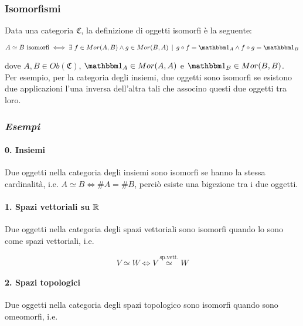 \subsubsection{Isomorfismi}

Data una categoria $ \mathfrak{C} $, la definizione di oggetti isomorfi è la seguente:

\begin{equation}
	A \simeq B \text{ isomorfi} \iff \E f \in Mor(A,B) \wedge g \in Mor(B,A) \, \mid \, g \circ f = \bigone_{A} \wedge f \circ g = \bigone_{B}
\end{equation}

dove $ A,B \in Ob(\mathfrak{C}) $, $ \bigone_{A} \in Mor(A,A) $ e $ \bigone_{B} \in Mor(B,B) $.\\
Per esempio, per la categoria degli insiemi, due oggetti sono isomorfi se esistono due applicazioni l'una inversa dell'altra tali che associno questi due oggetti tra loro.

\subsubsection{\textit{Esempi}}

\paragraph{0. Insiemi}

Due oggetti nella categoria degli insiemi sono isomorfi se hanno la stessa cardinalità, i.e. $ A \simeq B \iff \# A = \# B $, perciò esiste una bigezione tra i due oggetti.

\paragraph{1. Spazi vettoriali su $ \mathbb{R} $}

Due oggetti nella categoria degli spazi vettoriali sono isomorfi quando lo sono come spazi vettoriali, i.e.

\begin{equation}
	V \simeq W \iff V \stackrel{\text{sp.vett.}}{\simeq} W
\end{equation}

\paragraph{2. Spazi topologici}

Due oggetti nella categoria degli spazi topologico sono isomorfi quando sono omeomorfi, i.e.

